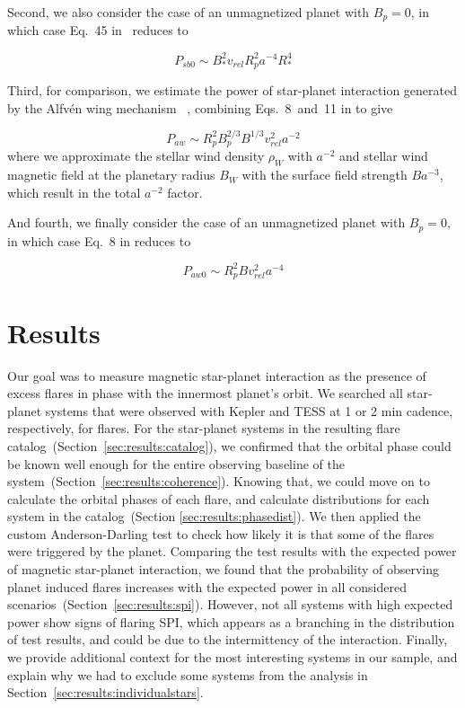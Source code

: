 \documentclass[twocolumn]{aastex631}
\begin{document}
Second, we also consider the case of an unmagnetized planet with $B_p=0$, in which case Eq.~45 in~\cite{lanza2012starplanet} reduces to

\begin{equation}
    P_{sb0} \sim B_*^2 v_{rel}  R_p^2  a^{-4} R_*^4
\end{equation}

Third, for comparison, we estimate the power of star-planet interaction generated by the Alfv\'en wing mechanism ~\cite{saur2013magnetic,kavanagh2022radio}, combining Eqs.~8~and~11 in \cite{kavanagh2022radio} to give

\begin{equation}
    P_{aw} \sim R_{p}^2  B_p^{2/3}  B^{1/3}  v_{rel}^2 a^{-2}  
\end{equation}
where we approximate the stellar wind density $\rho_W$ with $a^{-2}$ and stellar wind magnetic field at the planetary radius $B_W$ with the surface field strength $B a^{-3}$, which result in the total $a^{-2}$ factor.

And fourth, we finally consider the case of an unmagnetized planet with $B_p=0$, in which case Eq.~8 in \cite{kavanagh2022radio} reduces to

\begin{equation}
    P_{aw0} \sim R_p^2  B  v_{rel}^2  a^{-4}
\end{equation}


\section{Results}
\label{sec:results}

Our goal was to measure magnetic star-planet interaction as the presence of excess flares in phase with the innermost planet's orbit. We searched all star-planet systems that were observed with Kepler and TESS at 1 or 2 min cadence, respectively, for flares. For the star-planet systems in the resulting flare catalog~(Section~\ref{sec:results:catalog}), we confirmed that the orbital phase could be known well enough for the entire observing baseline of the system~(Section~\ref{sec:results:coherence}). Knowing that, we could move on to calculate the orbital phases of each flare, and calculate distributions for each system in the catalog~(Section \ref{sec:results:phasedist}). We then applied the custom Anderson-Darling test to check how likely it is that some of the flares were triggered by the planet. Comparing the test results with the expected power of magnetic star-planet interaction, we found that the probability of observing planet induced flares increases with the expected power in all considered scenarios~(Section~\ref{sec:results:spi}). However, not all systems with high expected power show signs of flaring SPI, which appears as a branching in the distribution of test results, and could be due to the intermittency of the interaction. Finally, we provide additional context for the most interesting systems in our sample, and explain why we had to exclude some systems from the analysis in Section~\ref{sec:results:individualstars}.
\end{document}

